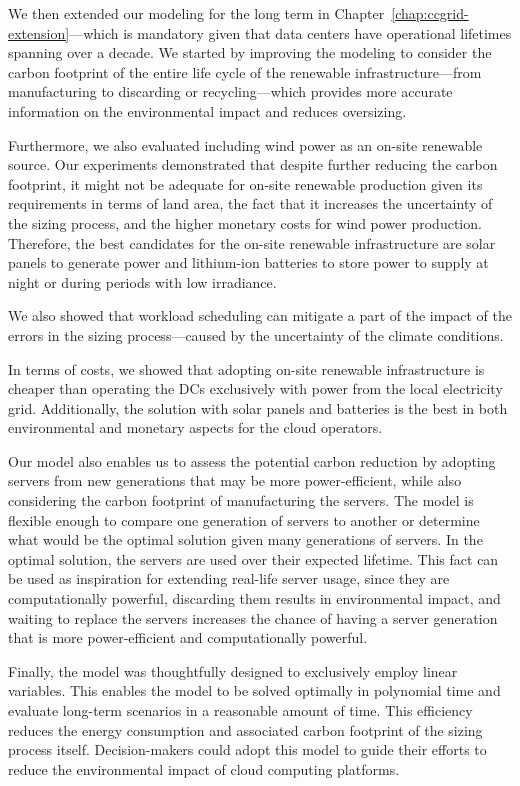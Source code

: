 We then extended our modeling for the long term in Chapter~\ref{chap:ccgrid-extension}---which is mandatory given that data centers have operational lifetimes spanning over a decade. We started by improving the modeling to consider the carbon footprint of the entire life cycle of the renewable infrastructure---from manufacturing to discarding or recycling---which provides more accurate information on the environmental impact and reduces oversizing. 

Furthermore, we also evaluated including wind power as an on-site renewable source. Our experiments demonstrated that despite further reducing the carbon footprint, it might not be adequate for on-site renewable production given its requirements in terms of land area, the fact that it increases the uncertainty of the sizing process, and the higher monetary costs for wind power production. Therefore, the best candidates for the on-site renewable infrastructure are solar panels to generate power and lithium-ion batteries to store power to supply at night or during periods with low irradiance. 

We also showed that workload scheduling can mitigate a part of the impact of the errors in the sizing process---caused by the uncertainty of the climate conditions. 

In terms of costs, we showed that adopting on-site renewable infrastructure is cheaper than operating the DCs exclusively with power from the local electricity grid. Additionally, the solution with solar panels and batteries is the best in both environmental and monetary aspects for the cloud operators. 

Our model also enables us to assess the potential carbon reduction by adopting servers from new generations that may be more power-efficient, while also considering the carbon footprint of manufacturing the servers. The model is flexible enough to compare one generation of servers to another or determine what would be the optimal solution given many generations of servers. In the optimal solution, the servers are used over their expected lifetime. This fact can be used as inspiration for extending real-life server usage, since they are computationally powerful, discarding them results in environmental impact, and waiting to replace the servers increases the chance of having a server generation that is more power-efficient and computationally powerful.

Finally, the model was thoughtfully designed to exclusively employ linear variables. This enables the model to be solved optimally in polynomial time and evaluate long-term scenarios in a reasonable amount of time. This efficiency reduces the energy consumption and associated carbon footprint of the sizing process itself. Decision-makers could adopt this model to guide their efforts to reduce the environmental impact of cloud computing platforms.

